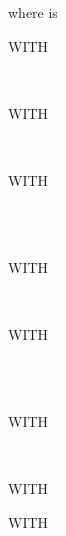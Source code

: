 where  is

\begin{syntax}[\miscextcolour]
  \begin{0-1}
    WITH
    \begin{1=}
       \\
    \end{1=}
  \end{0-1}

  \begin{0-1}
    WITH
    \begin{1=}
       \\
    \end{1=}
  \end{0-1}

  \begin{0-1}
    WITH
    \begin{1=}
       \\
       \\
    \end{1=}
  \end{0-1}

  \begin{0-1}
    WITH
    \begin{1=}
       \\
    \end{1=}
  \end{0-1}

  \begin{0-1}
    WITH
    \begin{1=}
       \\
        \\
    \end{1=}
  \end{0-1}

  \begin{0-1}
    WITH
    \begin{1=}
       \\
    \end{1=}
  \end{0-1}

  \begin{0-1}
    WITH 
  \end{0-1}

  \begin{0-1}
    WITH
    \begin{0-1}
    \end{0-1}
    \begin{1=}
       \\
    \end{1=}
  \end{0-1}


\end{syntax}
